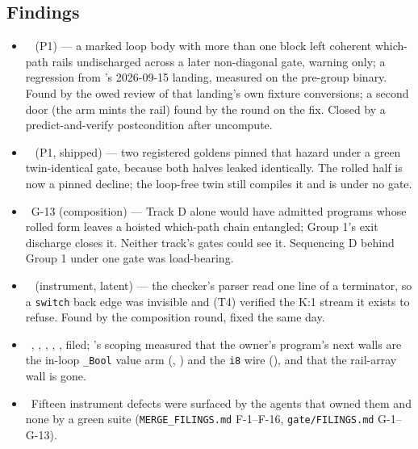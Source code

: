 \subsection*{Findings}
\begin{itemize}
  \item \fconfirmed\  (P1) --- a marked loop body with more than one block left coherent
        which-path rails undischarged across a later non-diagonal gate, warning only; a regression from
        's 2026-09-15 landing, measured on the pre-group binary. Found by the owed review of
        that landing's own fixture conversions; a second door (the arm mints the rail) found by the
        round on the fix. Closed by a predict-and-verify postcondition after uncompute.
  \item \fconfirmed\  (P1, shipped) --- two registered goldens pinned that hazard under a
        green twin-identical gate, because both halves leaked identically. The rolled half is now a
        pinned decline; the loop-free twin still compiles it and is under no gate.
  \item \fconfirmed\ G-13 (composition) --- Track D alone would have admitted programs whose rolled
        form leaves a hoisted which-path chain entangled; Group 1's exit discharge closes it. Neither
        track's gates could see it. Sequencing D behind Group 1 under one gate was load-bearing.
  \item \fconfirmed\  (instrument, latent) --- the checker's parser read one line of a
        terminator, so a \texttt{switch} back edge was invisible and (T4) verified the K:1 stream it
        exists to refuse. Found by the composition round, fixed the same day.
  \item \foverdecline\ , , , , ,  filed;
        's scoping measured that the owner's program's next walls are the in-loop
        \texttt{\_Bool} value arm (, ) and the \texttt{i8} wire (), and
        that the rail-array wall is gone.
  \item \fdoc\ Fifteen instrument defects were surfaced by the agents that owned them and none by a
        green suite (\texttt{MERGE\_FILINGS.md} F-1--F-16, \texttt{gate/FILINGS.md} G-1--G-13).
\end{itemize}

